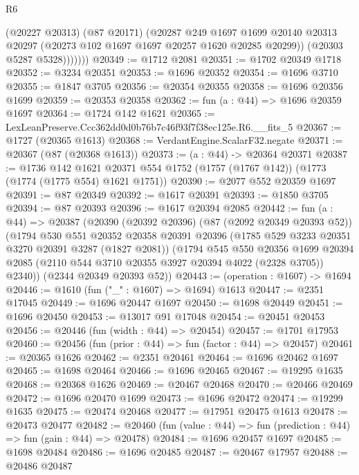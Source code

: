 \begin{lexlean}{R6}
\begin{coremodule}
                (@20227 @20313)
                (@87 @20171)
                (@20287
                  @249
                  @1697
                  @1699
                  @20140
                  @20313
                  @20297
                  (@20273 @102 @1697 @1697 @20257 @1620 @20285 @20299))
                (@20303 @5287 @5328)))))))
@20349 := @1712 @2081
@20351 := @1702 @20349 @1718
@20352 := @3234 @20351
@20353 := @1696 @20352
@20354 := @1696 @3710
@20355 := @1847 @3705
@20356 := @20354 @20355
@20358 := @1696 @20356 @1699
@20359 := @20353 @20358
@20362 := fun (a : @44) => @1696 @20359 @1697
@20364 := @1724 @142 @1621
@20365 := LexLeanPreserve.Ccc362dd0d0b76b7c46f93f7f38ec125e.R6.__fits_5
@20367 := @1727 (@20365 @1613)
@20368 := VerdantEngine.ScalarF32.negate
@20371 := @20367 (@87 (@20368 @1613))
@20373 := (a : @44) -> @20364 @20371
@20387 := @1736
    @142
    @1621
    @20371
    @554
    @1752
    (@1757 (@1767 @142))
    (@1773 (@1774 (@1775 @554) @1621 @1751))
@20390 := @2077 @552 @20359 @1697
@20391 := @87 @20349
@20392 := @1617 @20391
@20393 := @1850 @3705
@20394 := @87 @20393
@20396 := @1617 @20394 @2085
@20442 := fun (a : @44) =>
  @20387
    (@20390
      (@20392 @20396)
      (@87 (@2092 @20349 @20393 @52))
      (@1794
        @530
        @551
        @20352
        @20358
        @20391
        @20396
        (@1785 @529 @3233 @20351 @3270 @20391 @3287 (@1827 @2081))
        (@1794
          @545
          @550
          @20356
          @1699
          @20394
          @2085
          (@2110 @544 @3710 @20355 @3927 @20394 @4022 (@2328 @3705))
          @2340))
      (@2344 @20349 @20393 @52))
@20443 := (operation : @1607) -> @1694
@20446 := @1610 (fun ("_" : @1607) => @1694) @1613
@20447 := @2351 @17045
@20449 := @1696 @20447 @1697
@20450 := @1698 @20449
@20451 := @1696 @20450
@20453 := @13017 @91 @17048
@20454 := @20451 @20453
@20456 := @20446 (fun (width : @44) => @20454)
@20457 := @1701 @17953
@20460 := @20456 (fun (prior : @44) => fun (factor : @44) => @20457)
@20461 := @20365 @1626
@20462 := @2351 @20461
@20464 := @1696 @20462 @1697
@20465 := @1698 @20464
@20466 := @1696 @20465
@20467 := @19295 @1635
@20468 := @20368 @1626
@20469 := @20467 @20468
@20470 := @20466 @20469
@20472 := @1696 @20470 @1699
@20473 := @1696 @20472
@20474 := @19299 @1635
@20475 := @20474 @20468
@20477 := @17951 @20475 @1613
@20478 := @20473 @20477
@20482 := @20460 (fun (value : @44) => fun (prediction : @44) => fun (gain : @44) => @20478)
@20484 := @1696 @20457 @1697
@20485 := @1698 @20484
@20486 := @1696 @20485
@20487 := @20467 @17957
@20488 := @20486 @20487

\end{coremodule}
\end{lexlean}
